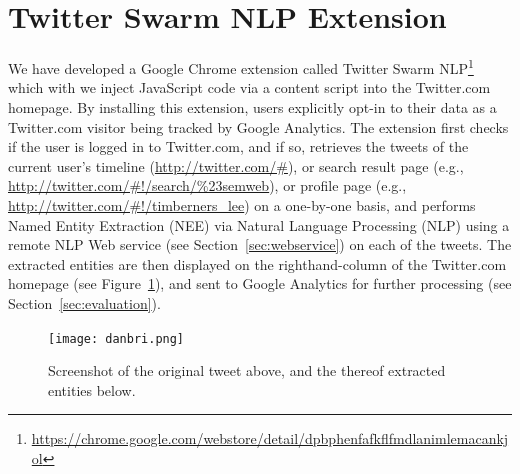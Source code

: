 \documentclass[runningheads,a4paper]{llncs}
\begin{document}
\section{Twitter Swarm NLP Extension}\label{sec:twitterswarm}
We have developed a Google Chrome extension called Twitter Swarm NLP\footnote{\url{https://chrome.google.com/webstore/detail/dpbphenfafkflfmdlanimlemacankjol}} which with we inject JavaScript code via a content script into the Twitter.com homepage. By installing this extension, users explicitly opt-in to their data as a Twitter.com visitor being tracked by Google Analytics. The extension first checks if the user is logged in to Twitter.com, and if so, retrieves the tweets of the current user's timeline (\url{http://twitter.com/#}), or search result page (e.g., \url{http://twitter.com/#!/search/%23semweb}), or profile page (e.g., \url{http://twitter.com/#!/timberners_lee}) on a one-by-one basis, and performs Named Entity Extraction (NEE) via Natural Language Processing (NLP) using a remote NLP Web service (see Section~\ref{sec:webservice}) on each of the tweets. The extracted entities are then displayed on the righthand-column of the Twitter.com homepage (see Figure~\ref{fig:danbri}), and sent to Google Analytics for further processing (see Section~\ref{sec:evaluation}).

\begin{figure}[ht!]
  \centering
  \texttt{[image: danbri.png]}
  \caption{Screenshot of the original tweet above, and the thereof extracted entities below.}
  \label{fig:danbri}
\end{figure}

\end{document}

